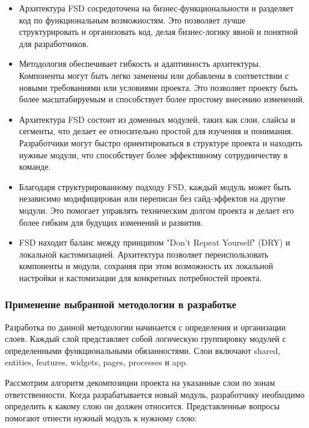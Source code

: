 \begin{itemize}
    \item Архитектура FSD сосредоточена на бизнес-функциональности и разделяет код по функциональным возможностям. Это позволяет лучше структурировать и организовать код, делая бизнес-логику явной и понятной для разработчиков.
    \item Методология обеспечивает гибкость и адаптивность архитектуры. Компоненты могут быть легко заменены или добавлены в соответствии с новыми требованиями или условиями проекта. Это позволяет проекту быть более масштабируемым и способствует более простому внесению изменений.
    \item Архитектура FSD состоит из доменных модулей, таких как слои, слайсы и сегменты, что делает ее относительно простой для изучения и понимания. Разработчики могут быстро ориентироваться в структуре проекта и находить нужные модули, что способствует более эффективному сотрудничеству в команде.
    \item Благодаря структурированному подходу FSD, каждый модуль может быть независимо модифицирован или переписан без сайд-эффектов на другие модули. Это помогает управлять техническим долгом проекта и делает его более гибким для будущих изменений и развития.
    \item FSD находит баланс между принципом "Don't Repeat Yourself" (DRY) и локальной кастомизацией. Архитектура позволяет переиспользовать компоненты и модули, сохраняя при этом возможность их локальной настройки и кастомизации для конкретных потребностей проекта.
\end{itemize}

\subsubsection{Применение выбранной методологии в разработке}

Разработка по данной методологии начинается с определения и организации слоев. Каждый слой представляет собой логическую группировку модулей с определенными функциональными обязанностями. Слои включают shared, entities, features, widgets, pages, processes и app.

Рассмотрим алгоритм декомпозиции проекта на указанные слои по зонам ответственности. Когда разрабатывается новый модуль, разработчику необходимо определить к какому слою он должен относится. Представленные вопросы помогают отнести нужный модуль к нужному слою:

